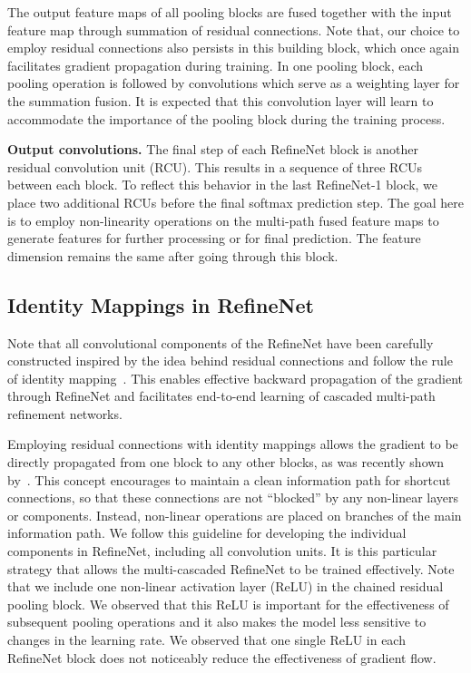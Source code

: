 \documentclass[10pt,twocolumn,letterpaper]{article}
\newcommand{\myparagraph}[1]{\vspace{.5em}\noindent\textbf{#1}}
\begin{document}
The output feature maps of all pooling blocks are fused together with the input feature map through summation of residual connections.
Note that, our choice to employ residual connections also persists in this building block, which once again facilitates gradient propagation during training.
In one pooling block, each pooling operation is followed by convolutions which serve as a weighting layer for the summation fusion.
It is expected that this convolution layer will learn to accommodate the importance of the pooling block during the training process.



\myparagraph{Output convolutions.}
The final step of each RefineNet block is another residual convolution unit (RCU). This results in a sequence of three RCUs between each block. To reflect this behavior in the last RefineNet-1 block, we place two additional RCUs before the final softmax prediction step.
The goal here is to employ non-linearity operations on the multi-path fused feature maps to generate features for further processing or for final prediction.
The feature dimension remains the same after going through this block.



\subsection{Identity Mappings in RefineNet}
Note that all convolutional components of the RefineNet have been carefully constructed inspired by the idea behind residual connections and follow the rule of identity mapping~\cite{he2016identity}. 
This enables effective backward propagation of the gradient through RefineNet and facilitates end-to-end learning of cascaded multi-path refinement networks.

Employing residual connections with identity mappings allows the gradient to be directly propagated from one block to any other blocks, as was recently shown by~\cite{he2016identity}.  This concept encourages to maintain a clean information path for shortcut connections,
so that these connections are not ``blocked'' by any non-linear layers or components. Instead, non-linear operations are placed on branches of the main information path.
We follow this guideline for developing the individual components in RefineNet, including all convolution units.
It is this particular strategy that allows the multi-cascaded RefineNet to be trained effectively.
Note that we include one non-linear activation layer (ReLU) in the chained residual pooling block. We observed that this ReLU is important for the effectiveness of subsequent pooling operations and it also makes the model less sensitive to changes in the learning rate. We observed that one single ReLU in each RefineNet block does not noticeably reduce the effectiveness of gradient flow.
\end{document}
